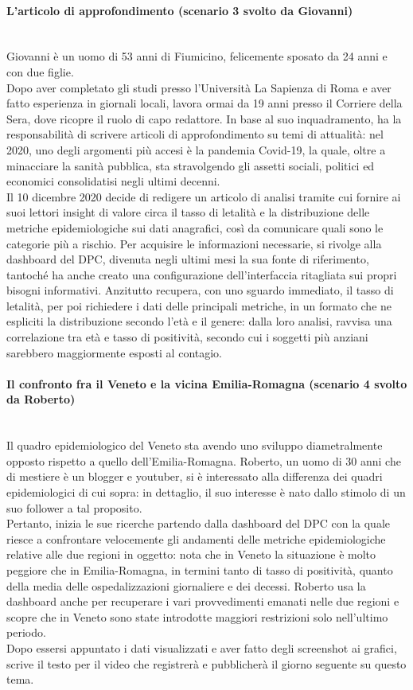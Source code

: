 \paragraph{L'articolo di approfondimento (scenario 3 svolto da Giovanni)}\mbox{}\\
Giovanni è un uomo di 53 anni di Fiumicino, felicemente sposato da 24 anni e con due figlie.\\
Dopo aver completato gli studi presso l'Università La Sapienza di Roma e aver fatto esperienza in giornali locali, lavora ormai da 19 anni presso il Corriere della Sera, dove ricopre il ruolo di capo redattore.
In base al suo inquadramento, ha la responsabilità di scrivere articoli di approfondimento su temi di attualità: nel 2020, uno degli argomenti più accesi è la pandemia Covid-19, la quale, oltre a minacciare la sanità pubblica, sta stravolgendo gli assetti sociali, politici ed economici consolidatisi negli ultimi decenni.\\
Il 10 dicembre 2020 decide di redigere un articolo di analisi tramite cui fornire ai suoi lettori insight di valore circa il tasso di letalità e la distribuzione delle metriche epidemiologiche sui dati anagrafici, così da comunicare quali sono le categorie più a rischio.
Per acquisire le informazioni necessarie, si rivolge alla dashboard del DPC, divenuta negli ultimi mesi la sua fonte di riferimento, tantoché ha anche creato una configurazione dell'interfaccia ritagliata sui propri bisogni informativi.
Anzitutto recupera, con uno sguardo immediato, il tasso di letalità, per poi richiedere i dati delle principali metriche, in un formato che ne espliciti la distribuzione secondo l'età e il genere: dalla loro analisi, ravvisa una correlazione tra età e tasso di positività, secondo cui i soggetti più anziani sarebbero maggiormente esposti al contagio. 
\noindent
\paragraph{Il confronto fra il Veneto e la vicina Emilia-Romagna (scenario 4 svolto da Roberto)}\mbox{}\\
Il quadro epidemiologico del Veneto sta avendo uno sviluppo diametralmente opposto rispetto a quello dell'Emilia-Romagna.
Roberto, un uomo di 30 anni che di mestiere è un blogger e youtuber, si è interessato alla differenza dei quadri epidemiologici di cui sopra: in dettaglio, il suo interesse è nato dallo stimolo di un suo follower a tal proposito.\\
Pertanto, inizia le sue ricerche partendo dalla dashboard del DPC con la quale riesce a confrontare velocemente gli andamenti delle metriche epidemiologiche relative alle due regioni in oggetto: nota che in Veneto la situazione è molto peggiore che in Emilia-Romagna, in termini tanto di tasso di positività, quanto della media delle ospedalizzazioni giornaliere e dei decessi.
Roberto usa la dashboard anche per recuperare i vari provvedimenti emanati nelle due regioni e scopre che in Veneto sono state introdotte maggiori restrizioni solo nell'ultimo periodo. \\
Dopo essersi appuntato i dati visualizzati e aver fatto degli screenshot ai grafici, scrive il testo per il video che registrerà e pubblicherà il giorno seguente su questo tema.
\noindent
